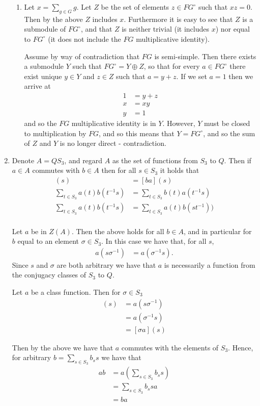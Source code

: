 \documentclass[11pt]{article} \usepackage{amssymb}
\begin{document}
\begin{enumerate}
\begin{enumerate}
  \item Let $x=\sum_{g \in G}g$. Let $Z$ be the set of elements $z \in
    FG^\circ$ such that $xz=0$. Then by the above $Z$ includes
    $x$. Furthermore it is easy to see that $Z$ is a submodule of
    $FG^\circ$, and that $Z$ is neither trivial (it includes $x$) nor
    equal to $FG^\circ$ (it does not include the $FG$ multiplicative
    identity).

    Assume by way of contradiction that $FG$ is semi-simple. Then
    there exists a submodule $Y$ such that $FG^\circ = Y \oplus Z$, so
    that for every $a \in FG^\circ$ there exist unique $y \in Y$ and
    $z \in Z$ such that $a=y+z$. If we set $a=1$ then we arrive at
    \begin{align*}
      1 &= y + z \\
      x &= xy \\
      y &= 1
    \end{align*}
    and so the $FG$ multiplicative identity is in $Y$. However, $Y$
    must be closed to multiplication by $FG$, and so this means that
    $Y=FG^\circ$, and so the sum of $Z$ and $Y$ is no longer direct -
    contradiction.
  \end{enumerate}
\item
  
  Denote $A=QS_3$, and regard $A$ as the set of functions from $S_3$
  to $Q$. Then if $a \in A$ commutes with $b \in A$ then for all $s
  \in S_3$ it holds that
  \begin{align*}
    [ab](s) &= [ba](s)  \\
    \sum_{t \in S_3}a(t)b(t^{-1}s) &= \sum_{t \in S_3}b(t)a(t^{-1}s) \\
    \sum_{t \in S_3}a(t)b(t^{-1}s) &= \sum_{t \in S_3}a(t)b(st^{-1})) \\
  \end{align*}

  Let $a$ be in $Z(A)$. Then the above holds for all $b \in A$, and in
  particular for $b$ equal to an element $\sigma \in S_3$. In this case we
  have that, for all $s$, 
  \begin{align*}
    a(s\sigma^{-1}) &= a(\sigma^{-1}s). 
  \end{align*}
  Since $s$ and $\sigma$ are both arbitrary we have that $a$ is
  necessarily a function from the conjugacy classes of $S_3$ to $Q$. 

  Let $a$ be a class function. Then for $\sigma \in S_3$
  \begin{align*}
    [a\sigma](s) &= a(s\sigma^{-1}) \\
    &= a(\sigma^{-1}s) \\
    &= [\sigma a](s)
  \end{align*}

  Then by the above we have that $a$
  commutes with the elements of $S_3$. Hence, for arbitrary $b =
  \sum_{s \in S_3}b_ss$ we have that
  \begin{align*}
    ab &= a\left(\sum_{s \in S_3}b_ss\right) \\
    &= \sum_{s \in S_3}b_ssa \\
    &= ba
  \end{align*}
  
\end{enumerate}
\end{document}
